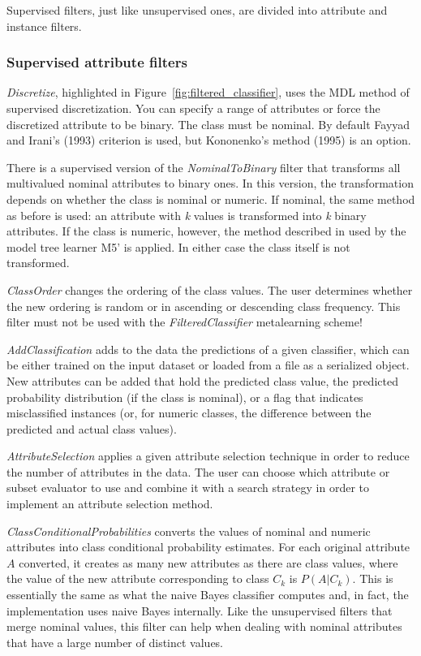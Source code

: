 Supervised filters, just like unsupervised ones, are divided into
attribute and instance filters.

\subsubsection{Supervised attribute filters}

\textit{Discretize}, highlighted in
Figure~\ref{fig:filtered_classifier}, uses the MDL method of
supervised discretization. You can specify a range of attributes or
force the discretized attribute to be binary. The class must be
nominal. By default Fayyad and Irani's (1993) criterion is used, but
Kononenko's method (1995) is an option.

There is a supervised version of the \textit{NominalToBinary} filter
that transforms all multivalued nominal attributes to binary ones. In
this version, the transformation depends on whether the class is
nominal or numeric. If nominal, the same method as before is used: an
attribute with \textit{k} values is transformed into \textit{k} binary
attributes. If the class is numeric, however, the method described in
used by the model tree learner M5' is applied. In either case the class itself is
not transformed.

\textit{ClassOrder} changes the ordering of the class values. The user
determines whether the new ordering is random or in ascending or
descending class frequency. This filter must not be used with the
\textit{FilteredClassifier} metalearning scheme!

\textit{AddClassification} adds to the data the predictions of a given
classifier, which can be either trained on the input dataset or loaded
from a file as a serialized object. New attributes can be added that
hold the predicted class value, the predicted probability distribution
(if the class is nominal), or a flag that indicates misclassified
instances (or, for numeric classes, the difference between the
predicted and actual class values).

\textit{AttributeSelection} applies a given attribute selection
technique in order to reduce the number of attributes in the data. The
user can choose which attribute or subset evaluator to use and combine
it with a search strategy in order to implement an attribute selection
method.

\textit{ClassConditionalProbabilities} converts the values of nominal
and numeric attributes into class conditional probability
estimates. For each original attribute $A$ converted, it creates as many
new attributes as there are class values, where the value of the new
attribute corresponding to class $C_k$ is $P(A | C_k)$. This is essentially the same as what the
naive Bayes classifier computes and, in fact, the implementation uses
naive Bayes internally. Like the unsupervised filters that merge
nominal values, this filter can help when dealing with nominal
attributes that have a large number of distinct values.

